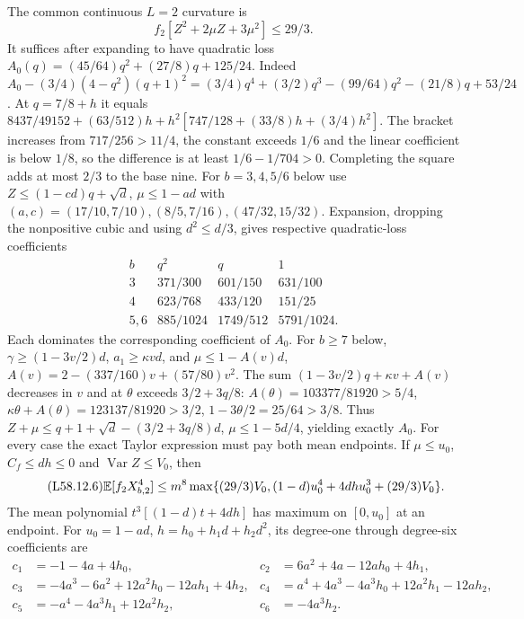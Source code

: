The common continuous $L=2$ curvature is
\begin{equation}\tag{L58.12.5}\label{eq:L58:curvature29}
f_2[Z^2+2\mu Z+3\mu^2]\le29/3.
\end{equation}
It suffices after expanding to have quadratic loss
$A_0(q)=(45/64)q^2+(27/8)q+125/24$.
Indeed
$A_0-(3/4)(4-q^2)(q+1)^2
=(3/4)q^4+(3/2)q^3-(99/64)q^2-(21/8)q+53/24$.
At $q=7/8+h$ it equals
$8437/49152+(63/512)h+h^2[747/128+(33/8)h+(3/4)h^2]$.
The bracket increases from $717/256>11/4$, the constant exceeds
$1/6$ and the linear coefficient is below $1/8$, so the difference
is at least $1/6-1/704>0$.
Completing the square adds at most $2/3$ to the base nine.
For $b=3,4,5/6$ below use $Z\le(1-cd)q+\sqrt d$,
$\mu\le1-ad$ with $(a,\allowbreak c)=(17/10,\allowbreak 7/10),\allowbreak (8/5,\allowbreak 7/16),\allowbreak 
(47/32,\allowbreak 15/32)$. Expansion, dropping the nonpositive cubic and using
$d^2\le d/3$, gives respective quadratic-loss coefficients
\[
\begin{array}{c|ccc}
b&q^2&q&1\\\hline
3&371/300&601/150&631/100\\
4&623/768&433/120&151/25\\
5,6&885/1024&1749/512&5791/1024.
\end{array}
\]
Each dominates the corresponding coefficient of $A_0$.
For $b\ge7$ below, $\gamma\ge(1-3v/2)d$,
$a_1\ge\kappa vd$, and $\mu\le1-A(v)d$,
$A(v)=2-(337/160)v+(57/80)v^2$.
The sum $(1-3v/2)q+\kappa v+A(v)$ decreases in $v$ and at
$\theta$ exceeds $3/2+3q/8$:
$A(\theta)=103377/81920>5/4$,
$\kappa\theta+A(\theta)=123137/81920>3/2$,
$1-3\theta/2=25/64>3/8$.
Thus $Z+\mu\le q+1+\sqrt d-(3/2+3q/8)d$,
$\mu\le1-5d/4$, yielding exactly $A_0$.
For every case the exact Taylor expression must pay both mean
endpoints. If $\mu\le u_0$, $C_f\le dh\le0$ and
$\operatorname{Var}Z\le V_0$, then
\begin{equation}\tag{L58.12.6}\label{eq:L58:endpoints}
\mathbb E[f_2X_{b,2}^4]\le m^8\max\{
(29/3)V_0,(1-d)u_0^4+4dhu_0^3+(29/3)V_0\}.
\end{equation}
The mean polynomial $t^3[(1-d)t+4dh]$ has maximum on $[0,u_0]$
at an endpoint. For $u_0=1-ad$, $h=h_0+h_1d+h_2d^2$, its
degree-one through degree-six coefficients are
\begin{equation}\tag{L58.12.7}\label{eq:L58:coefficients}
\begin{aligned}
c_1&=-1-4a+4h_0,&c_2&=6a^2+4a-12ah_0+4h_1,\\
c_3&=-4a^3-6a^2+12a^2h_0-12ah_1+4h_2,
&c_4&=a^4+4a^3-4a^3h_0+12a^2h_1-12ah_2,\\
c_5&=-a^4-4a^3h_1+12a^2h_2,&c_6&=-4a^3h_2.
\end{aligned}
\end{equation}

